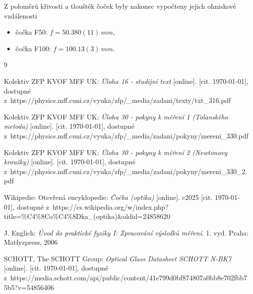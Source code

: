 \documentclass{../concepts/titul_protokol_p/prepareprotokol} %
\begin{document}
Z poloměrů křivosti a tlouštěk čoček byly nakonec vypočteny jejich ohniskové vzdálenosti
\vspace{-1mm}
\begin{itemize}
    \item čočka F50: $f = 50.380(11) \,\unit{mm}$,
    \item čočka F100: $f = 100.13(3) \,\unit{mm}$.
\end{itemize}

\begin{thebibliography}{9}


 Kolektiv ZFP KVOF MFF UK: \textit{Úloha 16 - studijní text} 
[online]. [cit. \today], dostupné
z~https://physics.mff.cuni.cz/vyuka/zfp/\_media/zadani/texty/txt\_316.pdf

 Kolektiv ZFP KVOF MFF UK: \textit{Úloha 30 - pokyny k měření 1 (Tolanského metoda)} 
[online]. [cit. \today], dostupné
z~https://physics.mff.cuni.cz/vyuka/zfp/\_media/zadani/pokyny/mereni\_330.pdf

 Kolektiv ZFP KVOF MFF UK: \textit{Úloha 30 - pokyny k měření 2 (Newtonovy kroužky)}
[online]. [cit. \today], dostupné
z~https://physics.mff.cuni.cz/vyuka/zfp/\_media/zadani/pokyny/mereni\_330\_2.pdf

 Wikipedie: Otevřená encyklopedie: \textit{Čočka (optika)} [online]. c2025 
[cit. \today], dostupné z~https://cs.wikipedia.org/w/index.php?title=\%C4\%8Co\%C4\%8Dka\_(optika)\&oldid=24858620

 J. Englich: \textit{Úvod do praktické fyziky I: Zpracování výsledků měření}. 
1. vyd. Praha: Matfyzpress, 2006

 SCHOTT, The SCHOTT Group: \textit{Optical Glass Datasheet SCHOTT N-BK7}  [online]. [cit. \today], dostupné
z~https://media.schott.com/api/public/content/41e799d0bf874807a0bb8e702fbb75b5?v=54856406



\end{thebibliography}
\end{document}
